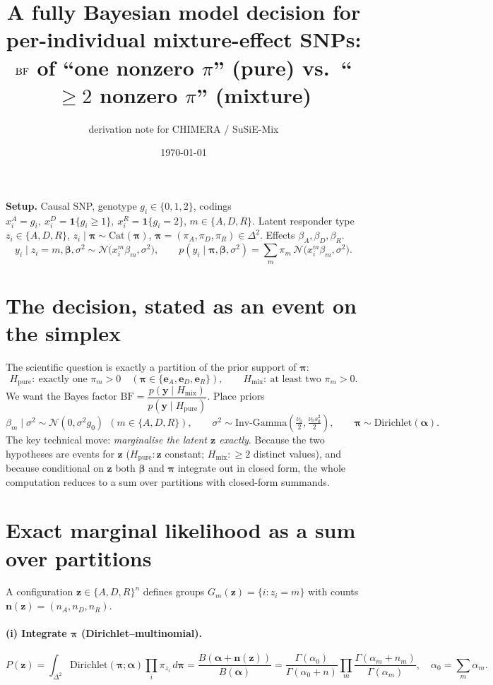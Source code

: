 \documentclass[11pt]{article}
\title{A fully Bayesian model decision for per-individual mixture-effect SNPs:\\
$\BF$ of ``one nonzero $\pi$'' (pure) vs.\ ``$\ge 2$ nonzero $\pi$'' (mixture)}
\author{derivation note for CHIMERA / SuSiE-Mix}
\date{\today}
\newcommand{\N}{\mathcal{N}}
\newcommand{\BF}{\mathrm{BF}}
\newcommand{\Dir}{\mathrm{Dirichlet}}
\newcommand{\simplex}{\Delta}
\begin{document}
\maketitle

\noindent\textbf{Setup.} Causal SNP, genotype $g_i\in\{0,1,2\}$, codings
$x_i^A=g_i,\ x_i^D=\mathbf 1\{g_i\ge1\},\ x_i^R=\mathbf 1\{g_i=2\}$, $m\in\{A,D,R\}$.
Latent responder type $z_i\in\{A,D,R\}$, $z_i\mid\bm\pi\sim\mathrm{Cat}(\bm\pi)$,
$\bm\pi=(\pi_A,\pi_D,\pi_R)\in\simplex^2$. Effects $\beta_A,\beta_D,\beta_R$.
\begin{equation}
y_i\mid z_i{=}m,\bm\beta,\sigma^2\sim\N\!\big(x_i^m\beta_m,\sigma^2\big),\qquad
p(y_i\mid\bm\pi,\bm\beta,\sigma^2)=\sum_m\pi_m\,\N\!\big(x_i^m\beta_m,\sigma^2\big).
\label{eq:lik}
\end{equation}

\section{The decision, stated as an event on the simplex}
The scientific question is exactly a partition of the prior support of $\bm\pi$:
\[
H_{\mathrm{pure}}:\ \text{exactly one }\pi_m>0
\quad(\bm\pi\in\{\bm e_A,\bm e_D,\bm e_R\}),
\qquad
H_{\mathrm{mix}}:\ \text{at least two }\pi_m>0 .
\]
We want the Bayes factor $\BF=\dfrac{p(\bm y\mid H_{\mathrm{mix}})}{p(\bm y\mid H_{\mathrm{pure}})}$.
Place priors
\begin{equation}
\beta_m\mid\sigma^2\sim\N(0,\sigma^2 g_0)\ \ (m\in\{A,D,R\}),\qquad
\sigma^2\sim\mathrm{Inv\text{-}Gamma}(\tfrac{\nu_0}2,\tfrac{\nu_0 s_0^2}{2}),\qquad
\bm\pi\sim\Dir(\bm\alpha).
\label{eq:priors}
\end{equation}
The key technical move: \emph{marginalise the latent $\bm z$ exactly}. Because the
two hypotheses are events for $\bm z$ ($H_{\mathrm{pure}}\!:\bm z$ constant;
$H_{\mathrm{mix}}\!:\ge 2$ distinct values), and because conditional on $\bm z$
both $\bm\beta$ and $\bm\pi$ integrate out in closed form, the whole computation
reduces to a sum over partitions with closed-form summands.

\section{Exact marginal likelihood as a sum over partitions}
A configuration $\bm z\in\{A,D,R\}^n$ defines groups $G_m(\bm z)=\{i:z_i=m\}$ with
counts $\bm n(\bm z)=(n_A,n_D,n_R)$.

\paragraph{(i) Integrate $\bm\pi$ (Dirichlet--multinomial).}
\begin{equation}
P(\bm z)=\int_{\simplex^2}\!\Dir(\bm\pi;\bm\alpha)\prod_i\pi_{z_i}\,d\bm\pi
=\frac{B(\bm\alpha+\bm n(\bm z))}{B(\bm\alpha)}
=\frac{\Gamma(\alpha_0)}{\Gamma(\alpha_0+n)}\prod_m\frac{\Gamma(\alpha_m+n_m)}{\Gamma(\alpha_m)},
\quad \alpha_0=\textstyle\sum_m\alpha_m .
\label{eq:dirmult}
\end{equation}
\end{document}
